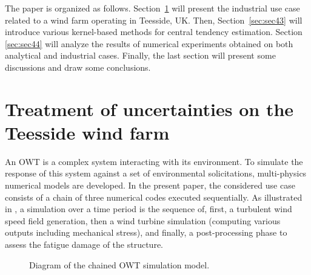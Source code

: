 The paper is organized as follows. 
Section~\ref{sec:sec42} will present the industrial use case related to a wind farm operating in Teesside, UK. 
Then, Section~\ref{sec:sec43} will introduce various kernel-based methods for central tendency estimation. 
Section \ref{sec:sec44} will analyze the results of numerical experiments obtained on both analytical and industrial cases. 
Finally, the last section will present some discussions and draw some conclusions.


\section{Treatment of uncertainties on the Teesside wind farm}\label{sec:sec42}

An OWT is a complex system interacting with its environment. 
To simulate the response of this system against a set of environmental solicitations, multi-physics numerical models are developed. 
In the present paper, the considered use case consists of a chain of three numerical codes executed sequentially. 
As illustrated in , a simulation over a time period is the sequence of, first, a turbulent wind speed field generation, then a wind turbine simulation (computing various outputs including mechanical stress), and finally, a post-processing phase to assess the fatigue damage of the structure.
\begin{figure}[h!]
\begin{center}
    
\end{center}
\caption{Diagram of the chained OWT simulation model.}
\label{fig:bloc_diagram}
\end{figure}


